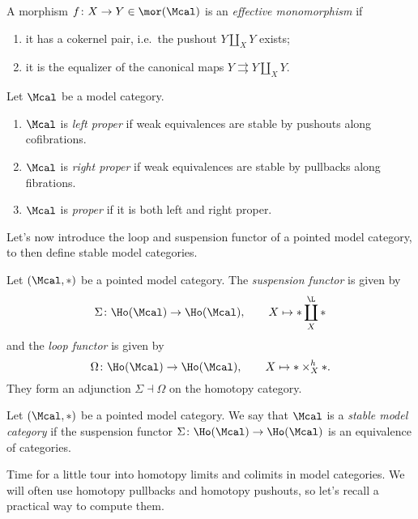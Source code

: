         \begin{defn}
            \label{defn:effective_mono}
            A morphism $f\colon X \to Y \in \mor(\Mcal)$ is an \emph{effective monomorphism} if 
            \begin{enumerate}
                \item it has a cokernel pair, i.e.\ the pushout $Y \coprod_X Y$ exists;
                \item it is the equalizer of the canonical maps $Y  \rightrightarrows Y \coprod_X Y$.
            \end{enumerate}
        \end{defn}
        \begin{defn}
            \label{defn:proper_model_categories}
            Let $\Mcal$ be a model category.
            \begin{enumerate}
                \item $\Mcal$ is \emph{left proper} if weak equivalences are stable by pushouts along cofibrations.
                \item $\Mcal$ is \emph{right proper} if weak equivalences are stable by pullbacks along fibrations.
                \item $\Mcal$ is \emph{proper} if it is both left and right proper.
            \end{enumerate}
        \end{defn}
        Let's now introduce the loop and suspension functor of a pointed model category, to then define stable model categories.
        \begin{defn}
            \label{defn:model_loop_suspension}
            Let $(\Mcal, *)$ be a pointed model category. The \emph{suspension functor} is given by \[\Sigma\colon \Ho(\Mcal) \to \Ho(\Mcal), \qquad X \mapsto * \coprod^{\L}_X * \] and the \emph{loop functor} is given by \[\Omega\colon \Ho(\Mcal) \to \Ho(\Mcal), \qquad X \mapsto * \times_X^h *. \] They form an adjunction $\Sigma \dashv \Omega$ on the homotopy category.
        \end{defn}
        \begin{defn}
            \label{defn:stable_model_category}
            Let $(\Mcal, *)$ be a pointed model category. We say that $\Mcal$ is a \emph{stable model category} if the suspension functor $\Sigma\colon \Ho(\Mcal) \to \Ho(\Mcal)$ is an equivalence of categories.
        \end{defn}
        Time for a little tour into homotopy limits and colimits in model categories. We will often use homotopy pullbacks and homotopy pushouts, so let's recall a practical way to compute them.
